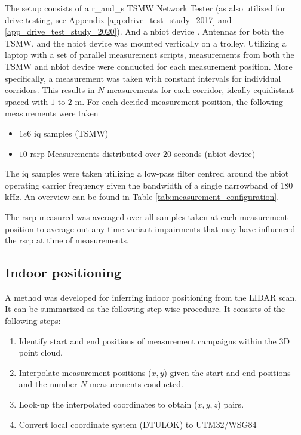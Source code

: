 The setup consists of a \gls{r_and_s} TSMW Network Tester \cite{Manual2017} (as also utilized for drive-testing, see Appendix \ref{app:drive_test_study_2017} and \ref{app_drive_test_study_2020}). And a \gls{nbiot} device \cite{sodaq}. Antennas for both the TSMW, and the \gls{nbiot} device was mounted vertically on a trolley. Utilizing a laptop with a set of parallel measurement scripts, measurements from both the TSMW and \gls{nbiot} device were conducted for each measurement position. More specifically, a measurement was taken with constant intervals for individual corridors. This results in $N$ measurements for each corridor, ideally equidistant spaced with $1$ to $2$ m. For each decided measurement position, the following measurements were taken

\begin{itemize}
    \item $1e6$ \gls{iq} samples (TSMW)
    \item $10$ \gls{rsrp} Measurements distributed over $20$ seconds (\gls{nbiot} device)
\end{itemize}


The \gls{iq} samples were taken utilizing a low-pass filter centred around the \gls{nbiot} operating carrier frequency given the bandwidth of a single narrowband of $180$ kHz. An overview can be found in Table \ref{tab:measurement_configuration}. 

The \gls{rsrp} measured was averaged over all samples taken at each measurement position to average out any time-variant impairments that may have influenced the \gls{rsrp} at time of measurements. 


\subsection{Indoor positioning}
A method was developed for inferring indoor positioning from the LIDAR scan. It can be summarized as the following step-wise procedure. It consists of the following steps:

\begin{enumerate}
    \item Identify start and end positions of measurement campaigns within the $3$D point cloud.
    \item Interpolate measurement positions ($x, y$) given the start and end positions and the number $N$ measurements conducted.
    \item Look-up the interpolated coordinates to obtain ($x, y, z$) pairs.
    \item Convert local coordinate system (DTULOK) to UTM32/WSG84
\end{enumerate}


